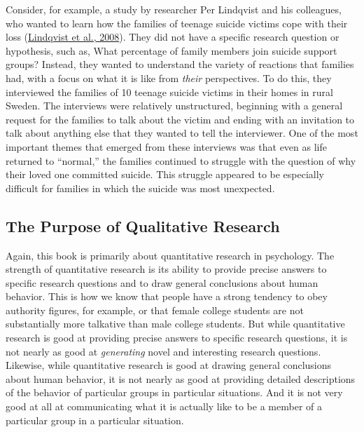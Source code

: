 \documentclass[
]{krantz}
\begin{document}
Consider, for example, a study by researcher Per Lindqvist and his colleagues, who wanted to learn how the families of teenage suicide victims cope with their loss (\protect\hyperlink{ref-lindqvist2008aftermath}{Lindqvist et al., 2008}). They did not have a specific research question or hypothesis, such as, What percentage of family members join suicide support groups? Instead, they wanted to understand the variety of reactions that families had, with a focus on what it is like from \emph{their} perspectives. To do this, they interviewed the families of 10 teenage suicide victims in their homes in rural Sweden. The interviews were relatively unstructured, beginning with a general request for the families to talk about the victim and ending with an invitation to talk about anything else that they wanted to tell the interviewer. One of the most important themes that emerged from these interviews was that even as life returned to ``normal,'' the families continued to struggle with the question of why their loved one committed suicide. This struggle appeared to be especially difficult for families in which the suicide was most unexpected.

\hypertarget{the-purpose-of-qualitative-research}{%
\subsection*{The Purpose of Qualitative Research}\label{the-purpose-of-qualitative-research}}


Again, this book is primarily about quantitative research in psychology. The strength of quantitative research is its ability to provide precise answers to specific research questions and to draw general conclusions about human behavior. This is how we know that people have a strong tendency to obey authority figures, for example, or that female college students are not substantially more talkative than male college students. But while quantitative research is good at providing precise answers to specific research questions, it is not nearly as good at \emph{generating} novel and interesting research questions. Likewise, while quantitative research is good at drawing general conclusions about human behavior, it is not nearly as good at providing detailed descriptions of the behavior of particular groups in particular situations. And it is not very good at all at communicating what it is actually like to be a member of a particular group in a particular situation.
\end{document}
